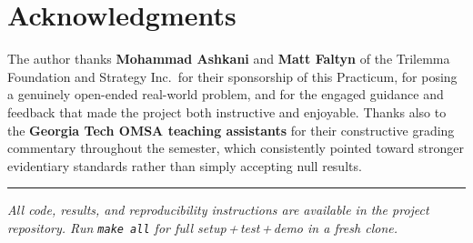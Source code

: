 \documentclass[11pt,letterpaper]{article}
\begin{document}
\section*{Acknowledgments}

The author thanks \textbf{Mohammad Ashkani} and \textbf{Matt Faltyn} of the
Trilemma Foundation and Strategy Inc.\ for their sponsorship of this Practicum,
for posing a genuinely open-ended real-world problem, and for the engaged
guidance and feedback that made the project both instructive and enjoyable.
Thanks also to the \textbf{Georgia Tech OMSA teaching assistants} for their
constructive grading commentary throughout the semester, which consistently
pointed toward stronger evidentiary standards rather than simply accepting
null results.

\bigskip
\noindent\rule{\textwidth}{0.4pt}

\noindent\small\textit{All code, results, and reproducibility instructions are
available in the project repository.  Run \texttt{make all} for full
setup\,+\,test\,+\,demo in a fresh clone.}
\end{document}
